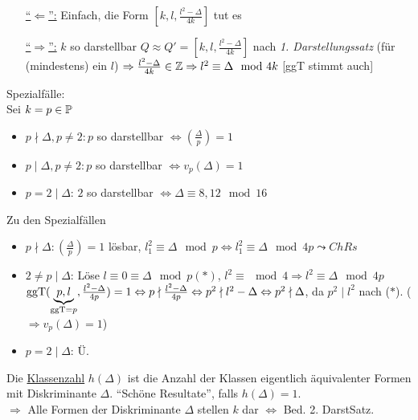 \documentclass[a4paper,DIV15,BCOR12mm]{article}
\begin{document}
\begin{beweis}
\begin{itemize}
\item[\underline{"`$\Leftarrow$"':}] Einfach, die Form $[k, l, \frac{l^2 - \Delta}{4k}]$ tut es
\item[\underline{"`$\Rightarrow$"':}] $k$ so darstellbar $Q \approx Q' = [k, l, \frac{l^2 - \Delta}{4k}]$ nach \emph{1. Darstellungssatz} (für (mindestens) ein $l$) $\Rightarrow \frac{l^2 - \Delta}{4k} \in \mathbb{Z} \Rightarrow l^2 \equiv \Delta \mod 4k$ [ggT stimmt auch]
\end{itemize}
\end{beweis}

Spezialfälle:\\
Sei $k = p \in \mathbb{P}$
\begin{itemize}
\item $p \nmid \Delta, p \not= 2: p$ so darstellbar $\Leftrightarrow (\frac{\Delta}{p}) = 1$
\item $p \mid \Delta, p \not= 2: p$ so darstellbar $\Leftrightarrow v_p(\Delta) = 1$
\item $p = 2 \mid \Delta$: $2$ so darstellbar $\Leftrightarrow \Delta \equiv 8, 12 \mod 16$
\end{itemize}

Zu den Spezialfällen
\begin{itemize}
\item $p \nmid \Delta: (\frac{\Delta}{p}) = 1$ lösbar, $l_1^2 \equiv \Delta \mod p \Leftrightarrow l_1^2 \equiv \Delta \mod 4p \leadsto ChRs$
\item $2 \not= p \mid \Delta$: Löse $l \equiv 0 \equiv \Delta \mod p (\ast)$, $l^2 \equiv \mod 4 \Rightarrow l^2 \equiv \Delta \mod 4p$\\
$\mathop{\rm ggT}\nolimits (\underbrace{p, l}_{\mathop{\rm ggT}\nolimits = p}, \frac{l^2 - \Delta}{4p}) = 1 \Leftrightarrow p \nmid \frac{l^2 - \Delta}{4p} \Leftrightarrow p^2 \nmid l^2 - \Delta \Leftrightarrow p^2 \nmid \Delta$, da $p^2 \mid l^2$ nach ($\ast$). ($\Rightarrow v_p(\Delta) = 1$)
\item $p = 2 \mid \Delta$: Ü.
\end{itemize}

\begin{definition}
Die \underline{Klassenzahl} $h(\Delta)$ ist die Anzahl der Klassen eigentlich äquivalenter Formen mit Diskriminante $\Delta$. "`Schöne Resultate"', falls $h(\Delta) = 1$.\\
$\Rightarrow$ Alle Formen der Diskriminante $\Delta$ stellen $k$ dar $\Leftrightarrow$ Bed. 2. DarstSatz.
\end{definition}
\end{document}
